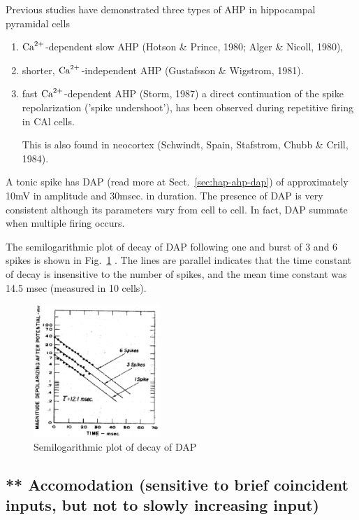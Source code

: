 Previous studies have demonstrated three types of AHP in hippocampal pyramidal
cells
\begin{enumerate}
  \item ${\text{Ca}^{2+}}$-dependent slow AHP (Hotson \& Prince, 1980; Alger \& Nicoll, 1980),
  
  \item shorter, ${\text{Ca}^{2+}}$-independent AHP (Gustafsson \& Wigstrom, 1981).
  
  \item fast ${\text{Ca}^{2+}}$-dependent AHP (Storm, 1987) a direct continuation of the
  spike repolarization ('spike undershoot'), has been observed during repetitive
  firing in CAl cells. 
  
  This is also found in neocortex (Schwindt, Spain, Stafstrom, Chubb \& Crill,
  1984).
\end{enumerate}



A tonic spike has DAP (read more at Sect.~\ref{sec:hap-ahp-dap}) of
approximately 10mV in amplitude and 30msec. in duration. The presence
of DAP is very consistent although its parameters vary from cell to
cell. In fact, DAP summate when multiple firing occurs. 


The semilogarithmic plot of decay of DAP following one and burst of 3
and 6 spikes is shown in Fig.~\ref{fig:semilog_plot} . The lines are
parallel indicates that the time constant of decay is insensitive to
the number of spikes, and the mean time constant was 14.5 msec
(measured in 10 cells).

\begin{figure}[hbt]
  \centerline{\includegraphics[height=5cm,
    angle=0]{./images/semilog_plot.eps}}
\caption{Semilogarithmic plot of decay of DAP}
\label{fig:semilog_plot}
\end{figure}

\subsection{** Accomodation (sensitive to brief coincident inputs, but not to
slowly increasing input)}
\label{sec:coincidenct}

